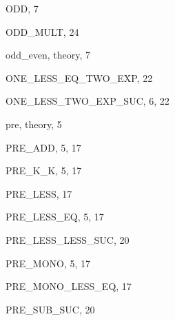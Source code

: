 \begin{theindex}
  \indexspace

  \item {\ptt ODD}, 7
  \item {\ptt ODD\_MULT}, 24
  \item {\ptt odd\_even}, theory, 7
  \item {\ptt ONE\_LESS\_EQ\_TWO\_EXP}, 22
  \item {\ptt ONE\_LESS\_TWO\_EXP\_SUC}, 6, 22

  \indexspace

  \item {\ptt pre}, theory, 5
  \item {\ptt PRE\_ADD}, 5, 17
  \item {\ptt PRE\_K\_K}, 5, 17
  \item {\ptt PRE\_LESS}, 17
  \item {\ptt PRE\_LESS\_EQ}, 5, 17
  \item {\ptt PRE\_LESS\_LESS\_SUC}, 20
  \item {\ptt PRE\_MONO}, 5, 17
  \item {\ptt PRE\_MONO\_LESS\_EQ}, 17
  \item {\ptt PRE\_SUB\_SUC}, 20

  \indexspace


\end{theindex}
